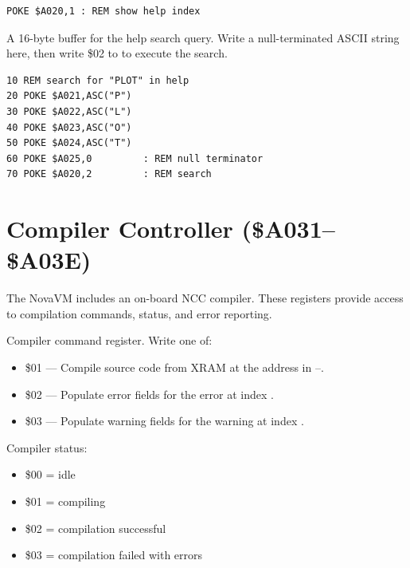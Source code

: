 \begin{lstlisting}
POKE $A020,1 : REM show help index
\end{lstlisting}


A 16-byte buffer for the help search query.  Write a null-terminated ASCII
string here, then write \$02 to  to execute the search.

\begin{lstlisting}
10 REM search for "PLOT" in help
20 POKE $A021,ASC("P")
30 POKE $A022,ASC("L")
40 POKE $A023,ASC("O")
50 POKE $A024,ASC("T")
60 POKE $A025,0         : REM null terminator
70 POKE $A020,2         : REM search
\end{lstlisting}


\section{Compiler Controller (\$A031--\$A03E)}
\label{sec:vgc-compiler}

The NovaVM includes an on-board NCC compiler.  These registers provide
access to compilation commands, status, and error reporting.


Compiler command register.  Write one of:
\begin{itemize}
  \item \$01 --- Compile source code from XRAM at the address in --.
  \item \$02 --- Populate error fields for the error at index .
  \item \$03 --- Populate warning fields for the warning at index .
\end{itemize}


Compiler status:
\begin{itemize}
  \item \$00 = idle
  \item \$01 = compiling
  \item \$02 = compilation successful
  \item \$03 = compilation failed with errors
\end{itemize}

